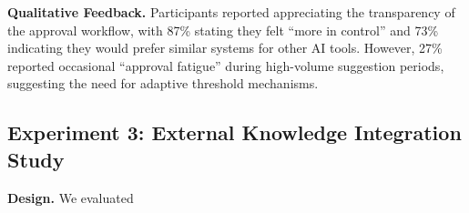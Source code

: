 \documentclass[letterpaper,10pt]{article}
\begin{document}
\textbf{Qualitative Feedback.} Participants reported appreciating the transparency of the approval workflow, with 87\% stating they felt ``more in control'' and 73\% indicating they would prefer similar systems for other AI tools. However, 27\% reported occasional ``approval fatigue'' during high-volume suggestion periods, suggesting the need for adaptive threshold mechanisms.

\subsection{Experiment 3: External Knowledge Integration Study}
\label{subsec:exp3}

\textbf{Design.} We evaluated
\end{document}
